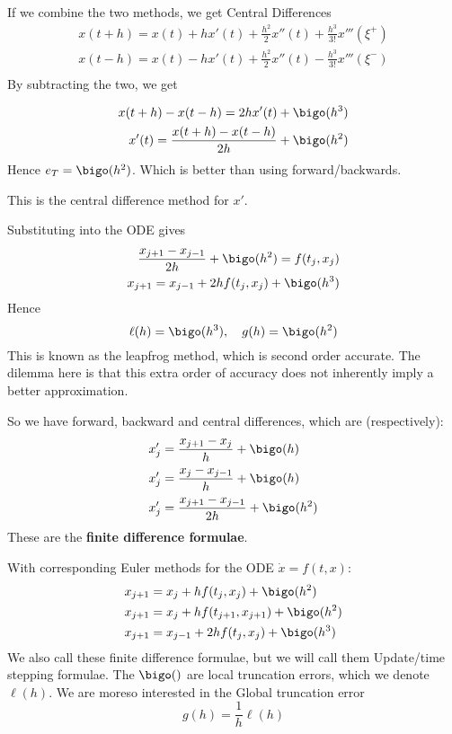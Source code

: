 \documentclass{X:/Documents/Coding/Latex/myassignment}
\begin{document}
If we combine the two methods, we get Central Differences
\begin{align*}
    x(t+h) = x(t) + hx'(t) + \frac{h^2}{2} x''(t) + \frac{h^3}{3!} x'''(\xi^+)\\
    x(t-h) = x(t) - hx'(t) + \frac{h^2}{2} x''(t) - \frac{h^3}{3!} x'''(\xi^-)\\
\end{align*}
By subtracting the two, we get

\begin{align*}
    x(t+h) - x(t-h) = 2hx'(t) + \bigo(h^3)\\
    x'(t) = \frac{x(t+h) - x(t-h)}{2h} + \bigo(h^2)    
\end{align*}
Hence $e_T = \bigo(h^2)$. Which is better than using forward/backwards.

This is the central difference method for $x'$.

Substituting into the ODE gives
\begin{align*}
    \frac{x_{j+1} - x_{j-1}}{2h} + \bigo(h^2) = f(t_j,x_j)\\
    x_{j+1} = x_{j-1} + 2hf(t_j,x_j) + \bigo(h^3)
\end{align*}
Hence
\[\ell(h) = \bigo(h^3),\quad g(h) = \bigo(h^2)\]
This is known as the leapfrog method, which is second order accurate. The dilemma here is that this extra order of accuracy does not inherently imply a better approximation.



So we have forward, backward and central differences, which are (respectively):
\begin{align*}
    x_j' &= \frac{x_{j+1} - x_j}{h} + \bigo(h)\\
    x_j' &= \frac{x_{j} - x_{j-1}}{h} + \bigo(h)\\
    x_j' &= \frac{x_{j+1} - x_{j-1}}{2h} + \bigo(h^2)\\
\end{align*}
These are the \textbf{finite difference formulae}.

With corresponding Euler methods for the ODE $\dot x = f(t,x)$:
\begin{align*}
    x_{j+1} &= x_j + h f(t_j,x_j) + \bigo(h^2) \\
    x_{j+1} &= x_j + h f(t_{j+1},x_{j+1}) + \bigo(h^2)\\
    x_{j+1} &= x_{j-1} + 2h f(t_j,x_j) + \bigo(h^3)
\end{align*}
We also call these finite difference formulae, but we will call them Update/time stepping formulae. The $\bigo()$ are local truncation errors, which we denote $\ell(h)$. We are moreso interested in the Global truncation error
\[g(h) = \frac1h \ell(h)\]
\end{document}
